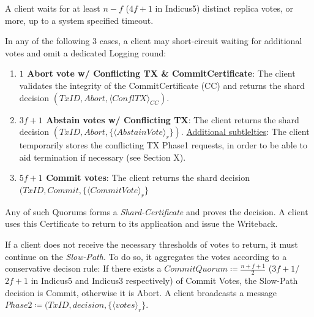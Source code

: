A client waits for at least $n-f$ ($4f+1$ in Indicus5) distinct replica votes, or more, up to a system specified timeout. 

In any of the following 3 cases, a client may short-circuit waiting for additional votes and omit a dedicated Logging round:
\begin{enumerate}
\item \textbf{$1$ Abort vote w/ Conflicting TX \& CommitCertificate}: The client validates the integrity of the CommitCertificate (CC) and returns the shard decision $(TxID, Abort, \langle ConflTX \rangle_{CC})$.
\item \textbf{$3f+1$ Abstain votes w/ Conflicting TX}: The client returns the shard decision $(TxID, Abort, \{\langle AbstainVote\rangle_r\})$. 
\underline{Additional subtlelties}: The client temporarily stores the conflicting TX Phase1 requests, in order to be able to aid termination if necessary (see Section X).
\item \textbf{$5f+1$ Commit votes}: The client returns the shard decision $(TxID, Commit, \{\langle CommitVote \rangle_r\}$
\end{enumerate}
Any of such Quorums forms a \textit{Shard-Certificate} and proves the decision. A client uses this Certificate to return to its application and issue the Writeback.

If a client does not receive the necessary thresholds of votes to return, it must continue on the \textit{Slow-Path}. To do so, it aggregates the votes according to a conservative decison rule:
If there exists a $CommitQuorum \coloneqq \frac{n+f+1}{2}$ ($3f+1$/$2f+1$ in Indicus5 and Indicus3 respectively) of Commit Votes, the Slow-Path decision is Commit, otherwise it is Abort.
A client broadcasts a message $Phase2 \coloneqq (TxID, decision, \{\langle votes \rangle_r\}$.

